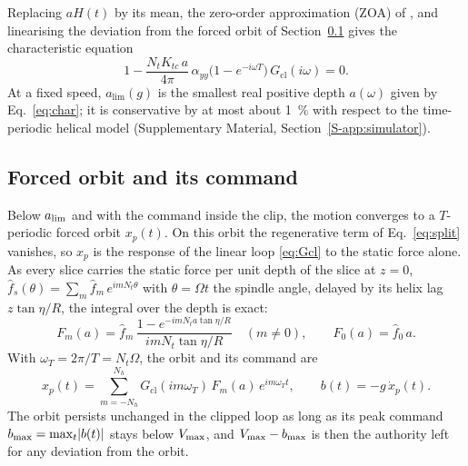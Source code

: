 Replacing $aH(t)$ by its mean, the zero-order approximation (ZOA) of \citet{altintas1995analytical}, and linearising the deviation from the forced orbit of Section~\ref{sec:model-orbit} gives the characteristic equation
\begin{equation}\label{eq:char}
  1-\frac{N_tK_{tc}\,a}{4\pi}\,\alpha_{yy}\bigl(1-e^{-i\omega T}\bigr)\,G_{\mathrm{cl}}(i\omega)=0 .
\end{equation}
At a fixed speed, $a_{\lim}(g)$ is the smallest real positive depth $a(\omega)$ given by Eq.~\eqref{eq:char}; it is conservative by at most about \SI{1}{\percent} with respect to the time-periodic helical model (Supplementary Material, Section~\ref{S-app:simulator}).

\subsection{Forced orbit and its command}\label{sec:model-orbit}

Below $a_{\lim}$ and with the command inside the clip, the motion converges to a $T$-periodic forced orbit $x_p(t)$. On this orbit the regenerative term of Eq.~\eqref{eq:split} vanishes, so $x_p$ is the response of the linear loop \eqref{eq:Gcl} to the static force alone. As every slice carries the static force per unit depth of the slice at $z=0$, $\hat f_s(\theta)=\sum_m\hat f_m\,e^{imN_t\theta}$ with $\theta=\Omega t$ the spindle angle, delayed by its helix lag $z\tan\eta/R$, the integral over the depth is exact:
\begin{equation}\label{eq:Fm}
  F_m(a)=\hat f_m\,\frac{1-e^{-imN_ta\tan\eta/R}}{imN_t\tan\eta/R}\quad(m\neq0),\qquad F_0(a)=\hat f_0\,a .
\end{equation}
With $\omega_T=2\pi/T=N_t\Omega$, the orbit and its command are
\begin{equation}\label{eq:xp}
  x_p(t)=\sum_{m=-N_h}^{N_h}G_{\mathrm{cl}}(im\omega_T)\,F_m(a)\,e^{im\omega_Tt},\qquad
  b(t)=-g\,\dot x_p(t).
\end{equation}
The orbit persists unchanged in the clipped loop as long as its peak command $b_{\max}=\max_t\lvert b(t)\rvert$ stays below $V_{\max}$, and $V_{\max}-b_{\max}$ is then the authority left for any deviation from the orbit.

